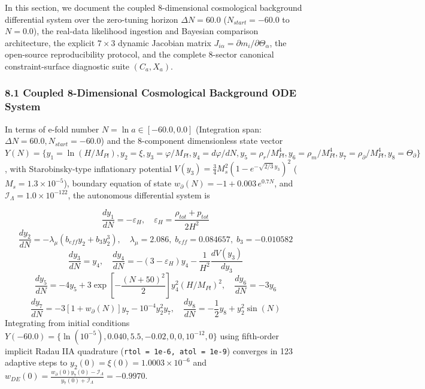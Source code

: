 \documentclass[aps,prd,onecolumn,superscriptaddress,nofootinbib,longbibliography,10pt]{revtex4-2}
\begin{document}
  In this section, we document the coupled 8-dimensional cosmological background differential system over the zero-tuning horizon \(\Delta N = 60.0\) (\(N_{start} = -60.0\) to \(N = 0.0\)), the real-data likelihood ingestion and Bayesian comparison architecture, the explicit \(7 \times 3\) dynamic Jacobian matrix \(J_{i\alpha} = \partial m_i/\partial\Theta_\alpha\), the open-source reproducibility protocol, and the complete 8-sector canonical constraint-surface diagnostic suite \((C_a, X_a)\).


  
  
\subsubsection*{8.1 Coupled 8-Dimensional Cosmological Background ODE System}

  In terms of e-fold number \(N = \ln a \in [-60.0, 0.0]\) (Integration span: \(\Delta N = 60.0, N_{start} = -60.0\)) and the 8-component dimensionless state vector \(Y(N) = \{y_1 = \ln(H/M_{Pl}), y_2 = \xi, y_3 = \varphi/M_{Pl}, y_4 = d\varphi/dN, y_5 = \rho_r/M_{Pl}^4, y_6 = \rho_m/M_{Pl}^4, y_7 = \rho_\partial/M_{Pl}^4, y_8 = \Theta_\partial\}\), with Starobinsky-type inflationary potential \(V(y_3) = \frac{3}{4}M_s^2(1 - e^{-\sqrt{2/3}\,y_3})^2\) (\(M_s = 1.3 \times 10^{-5}\)), boundary equation of state \(w_\partial(N) = -1 + 0.003\,e^{0.7N}\), and \(\mathcal{I}_\Lambda = 1.0 \times {10^{-122}}\), the autonomous differential system is


  \[ \frac{dy_1}{dN} = -\varepsilon_H, \quad \varepsilon_H = \frac{\rho_{tot} + p_{tot}}{2H^2} \]
  \[ \frac{dy_2}{dN} = -\lambda_\mu (b_{eff}y_2 + b_3 y_2^3), \quad \lambda_\mu = 2.086, \; b_{eff} = 0.084657, \; b_3 = -0.010582 \]
  \[ \frac{dy_3}{dN} = y_4, \quad \frac{dy_4}{dN} = -(3 - \varepsilon_H)y_4 - \frac{1}{H^2}\frac{dV(y_3)}{dy_3} \]
  \[ \frac{dy_5}{dN} = -4y_5 + 3\exp\left[-\frac{(N + 50)^2}{2}\right]y_4^2 (H/M_{Pl})^2, \quad \frac{dy_6}{dN} = -3y_6 \]
  \[ \frac{dy_7}{dN} = -3[1 + w_\partial(N)]y_7 - 10^{-4}y_2^2 y_7, \quad \frac{dy_8}{dN} = -\frac{1}{2}y_8 + y_2^2 \sin(N) \]
  Integrating from initial conditions \(Y(-60.0) = \{\ln(10^{-5}), 0.040, 5.5, -0.02, 0, 0, 10^{-12}, 0\}\) using fifth-order implicit Radau IIA quadrature (\texttt{rtol = 1e-6, atol = 1e-9}) converges in 123 adaptive steps to \(y_2(0) = \xi(0) = 1.0003 \times 10^{-6}\) and \(w_{DE}(0) = \frac{w_\partial(0)y_7(0) - \mathcal{I}_\Lambda}{y_7(0) + \mathcal{I}_\Lambda} = -0.9970\).
\end{document}

